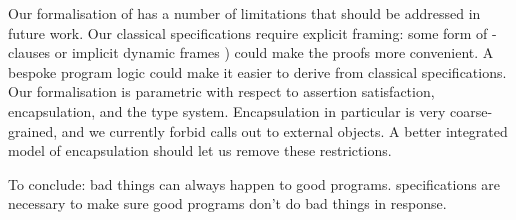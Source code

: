 Our formalisation of \Nec has a number of limitations that should be
addressed in future work.
Our classical specifications require explicit
framing: some form of -clauses or implicit dynamic frames
\cite{Leavens-etal07x,IshtiaqOHearn01,IDF,MattAlex,dafny13})
could make the proofs more convenient.
A bespoke program logic could make it easier to derive 
\Nec from classical specifications.
Our formalisation is parametric with respect to assertion
satisfaction, encapsulation, and the type system. Encapsulation in particular is
very coarse-grained, and we currently forbid 
calls out to external objects.  A better integrated model of
encapsulation should let us remove these restrictions.




To conclude: bad things can always happen to good programs. \Nec
specifications are necessary to make sure good programs don't do bad
things in response.
